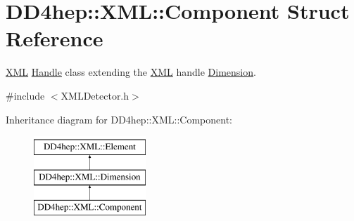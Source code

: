 \hypertarget{struct_d_d4hep_1_1_x_m_l_1_1_component}{}\section{D\+D4hep\+:\+:X\+ML\+:\+:Component Struct Reference}
\label{struct_d_d4hep_1_1_x_m_l_1_1_component}


\hyperlink{namespace_d_d4hep_1_1_x_m_l}{X\+ML} \hyperlink{class_d_d4hep_1_1_handle}{Handle} class extending the \hyperlink{namespace_d_d4hep_1_1_x_m_l}{X\+ML} handle \hyperlink{struct_d_d4hep_1_1_x_m_l_1_1_dimension}{Dimension}.  




{\ttfamily \#include $<$X\+M\+L\+Detector.\+h$>$}

Inheritance diagram for D\+D4hep\+:\+:X\+ML\+:\+:Component\+:\begin{figure}[H]
\begin{center}
\leavevmode
\includegraphics[height=3.000000cm]{struct_d_d4hep_1_1_x_m_l_1_1_component}
\end{center}
\end{figure}
